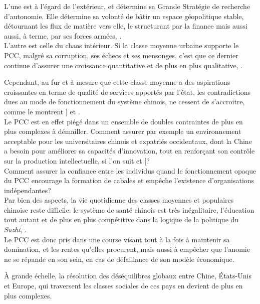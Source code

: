 \documentclass[a4paper]{article}
\begin{document}
L’une est à l’égard de l’extérieur, et détermine sa Grande Stratégie de
recherche d’autonomie. Elle détermine sa volonté de bâtir un espace géopolitique
stable, détournant les flux de matière vers elle, le structurant par la finance
mais aussi aussi, à terme, par ses forces armées, \cite{khan18_haunt}. \\

L’autre est celle du chaos intérieur. Si la classe moyenne urbaine supporte le
PCC, malgré sa corruption, ses échecs et ses mensonges, c’est que ce dernier
continue d’assurer une croissance quantitative et de plus en plus qualitative,
\cite{dickson16}.

Cependant, au fur et à mesure que cette classe moyenne a des aspirations
croissantes en terme de qualité de services apportés par l’état, les
contradictions dues au mode de fonctionnement du système chinois, ne cessent de
s’accroitre, comme le montrent \cite{cabestan18_demain_chine}] et \cite{dickson16}.\\

 Le PCC est en effet piégé dans un ensemble de doubles contraintes de plus en
plus complexes à démailler. Comment assurer par exemple un environnement
acceptable pour les universitaires chinois et expatriés occidentaux, dont la
Chine a besoin pour améliorer sa capacités d’innovation, tout en renforçant son
contrôle sur la production intellectuelle, si l’on suit \cite{haour16_creat_china}
et [\cite{simon09_chinas}?\\

Comment assurer la confiance entre les individus quand le fonctionnement opaque
du PCC encourage la formation de cabales et empêche l’existence d’orga\-ni\-sa\-tions
indépendantes?\\

Par bien des aspects, la vie quotidienne des classes moyennes et populaires
chinoise reste difficile: le système de santé chinois est très inégalitaire,
l’éducation tout autant et de plus en plus compétitive dans la logique de la
politique du \emph{Suzhi}, \cite{damien14_in}.\\

Le PCC est donc pris dans une course visant tout à la fois à maintenir sa
domination, et les rentes qu’elles procurent, mais aussi à empêcher que l’anomie
ne se répande en son sein, en cas de défaillance de son modèle économique.

À grande échelle, la résolution des déséquilibres globaux entre Chine,
États-Unis et Europe, qui traversent les classes sociales de ces pays en devient
de plus en plus complexes.\\
\end{document}
